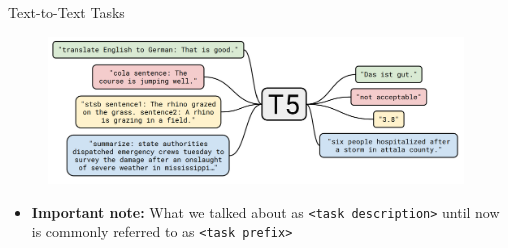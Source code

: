 \begin{frame}{Text-to-Text Tasks}

\vfill
	
	\begin{figure}
		\centering
		\includegraphics[width = 11cm]{figure/62-t5.png}\\ 
	\end{figure}
	
\begin{itemize}
	\item \textbf{Important note:} What we talked about as \texttt{<task description>} until now is commonly referred to as \texttt{<task prefix>}
\end{itemize}
	
\vfill

\end{frame}


\endlecture
